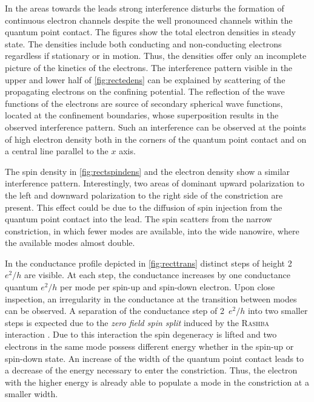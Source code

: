 In the areas towards the leads strong interference disturbs the formation of continuous electron channels despite the well pronounced channels within the quantum point contact. The figures show the total electron densities in steady state. The densities include both conducting and non-conducting electrons regardless if stationary or in motion. Thus, the densities offer only an incomplete picture of the kinetics of the electrons. The interference pattern visible in the upper and lower half of \cref{fig:rectedens} can be explained by scattering of the propagating electrons on the confining potential. The reflection of the wave functions of the electrons are source of secondary spherical wave functions, located at the confinement boundaries, whose superposition results in the observed interference pattern. Such an interference can be observed at the points of high electron density both in the corners of the quantum point contact and on a central line parallel to the $x$ axis.\par
The spin density in \cref{fig:rectspindens} and the electron density show a similar interference pattern. Interestingly, two areas of dominant upward polarization to the left and downward polarization to the right side of the constriction are present. This effect could be due to the diffusion of spin injection from the quantum point contact into the lead. The spin scatters from the narrow constriction, in which fewer modes are available, into the wide nanowire, where the available modes almost double.\par
In the conductance profile depicted in \cref{fig:recttrans} distinct steps of height 2~$e^2/h$ are visible. At each step, the conductance increases by one conductance quantum $e^2/h$ per mode per spin-up and spin-down electron. Upon close inspection, an irregularity in the conductance at the transition between modes can be observed. A separation of the conductance step of 2~$e^2/h$  into two smaller steps is expected due to the \emph{zero field spin split} induced by the \textsc{Rashba} interaction \cite{PhysRevB.41.8278}. Due to this interaction the spin degeneracy is lifted and two electrons in the same mode possess different energy whether in the spin-up or spin-down state. An increase of the width of the quantum point contact leads to a decrease of the energy necessary to enter the constriction. Thus, the electron with the higher energy is already able to populate a mode in the constriction at a smaller width.\par
\FloatBarrier
